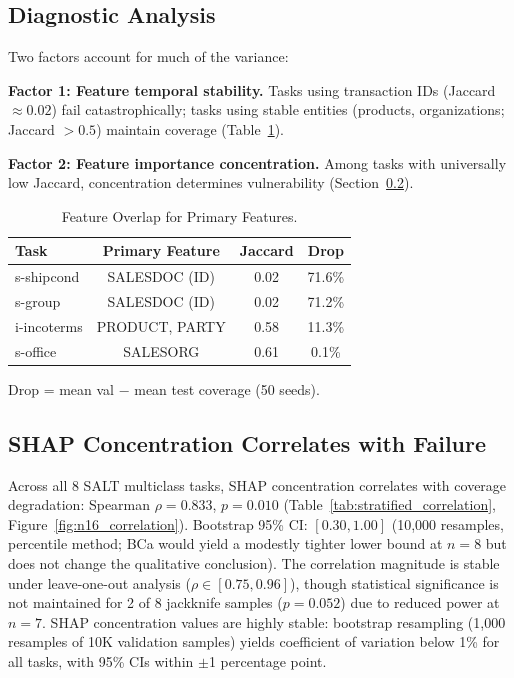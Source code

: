 \documentclass{uai2026} %
\begin{document}
\subsection{Diagnostic Analysis}

Two factors account for much of the variance:

\textbf{Factor 1: Feature temporal stability.} Tasks using transaction IDs (Jaccard $\approx 0.02$) fail catastrophically; tasks using stable entities (products, organizations; Jaccard $> 0.5$) maintain coverage (Table~\ref{tab:overlap}).

\textbf{Factor 2: Feature importance concentration.} Among tasks with universally low Jaccard, concentration determines vulnerability (Section~\ref{sec:shap_results}).

\begin{table}[t]
\centering
\caption{Feature Overlap for Primary Features.}\label{tab:overlap}
\small
\begin{tabular}{lccc}
\toprule
Task & Primary Feature & Jaccard & Drop \\
\midrule
s-shipcond & SALESDOC (ID) & 0.02 & 71.6\% \\
s-group & SALESDOC (ID) & 0.02 & 71.2\% \\
i-incoterms & PRODUCT, PARTY & 0.58 & 11.3\% \\
s-office & SALESORG & 0.61 & 0.1\% \\
\bottomrule
\end{tabular}


\raggedright
\footnotesize
Drop = mean val $-$ mean test coverage (50 seeds).
\end{table}

\subsection{SHAP Concentration Correlates with Failure}\label{sec:shap_results}

Across all 8 SALT multiclass tasks, SHAP concentration correlates with coverage degradation: Spearman $\rho = 0.833$, $p = 0.010$ (Table~\ref{tab:stratified_correlation}, Figure~\ref{fig:n16_correlation}). Bootstrap 95\% CI: $[0.30, 1.00]$ (10,000 resamples, percentile method; BCa would yield a modestly tighter lower bound at $n=8$ but does not change the qualitative conclusion). The correlation magnitude is stable under leave-one-out analysis ($\rho \in [0.75, 0.96]$), though statistical significance is not maintained for 2 of 8 jackknife samples ($p = 0.052$) due to reduced power at $n=7$. SHAP concentration values are highly stable: bootstrap resampling (1,000 resamples of 10K validation samples) yields coefficient of variation below 1\% for all tasks, with 95\% CIs within $\pm$1 percentage point.
\end{document}
